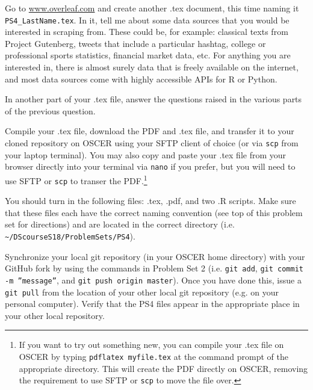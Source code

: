 \documentclass[12pt,english]{exam}
\begin{document}
\begin{questions}
\question Go to \url{www.overleaf.com} and create another .tex document, this time naming it \texttt{PS4\_LastName.tex}. In it, tell me about some data sources that you would be interested in scraping from. These could be, for example: classical texts from Project Gutenberg, tweets that include a particular hashtag, college or professional sports statistics, financial market data, etc. For anything you are interested in, there is almost surely data that is freely available on the internet, and most data sources come with highly accessible APIs for R or Python.

In another part of your .tex file, answer the questions raised in the various parts of the previous question.

\question Compile your .tex file, download the PDF and .tex file, and transfer it to your cloned repository on OSCER using your SFTP client of choice (or via \texttt{scp} from your laptop terminal). You may also copy and paste your .tex file from your browser directly into your terminal via \texttt{nano} if you prefer, but you will need to use SFTP or \texttt{scp} to transer the PDF.\footnote{If you want to try out something new, you can compile your .tex file on OSCER by typing \texttt{pdflatex myfile.tex} at the command prompt of the appropriate directory. This will create the PDF directly on OSCER, removing the requirement to use SFTP or \texttt{scp} to move the file over.}

\question You should turn in the following files: .tex, .pdf,  and two .R scripts.  Make sure that these files each have the correct naming convention (see top of this problem set for directions) and are located in the correct directory (i.e. \texttt{\textasciitilde/DScourseS18/ProblemSets/PS4}).

\question Synchronize your local git repository (in your OSCER home directory) with your GitHub fork by using the commands in Problem Set 2 (i.e. \texttt{git add}, \texttt{git commit -m ''message''}, and \texttt{git push origin master}). Once you have done this, issue a \texttt{git pull} from the location of your other local git repository (e.g. on your personal computer). Verify that the PS4 files appear in the appropriate place in your other local repository.

\end{questions}
\end{document}

